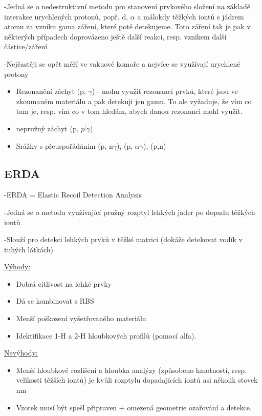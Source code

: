 -Jedná se o nedestruktivní metodu pro stanovení prvkového složení na základě interakce urychlených protonů, popř. d, $\alpha$ a málokdy těžkých iontů s jádrem atomu za vzniku gama záření, které poté detekujeme. Toto záření tak je pak v některých případech doprovázeno ještě další reakcí, resp. vznikem další částice/záření

-Nejčastěji se opět měří ve vakuové komoře a nejvíce se využívají urychlené protony

\begin{itemize}
    \item Rezonanční záchyt (p, $\gamma$) - mohu využít rezonancí prvků, které jsou ve zkoumaném materiálu a pak detekuji jen gamu. To ale vyžaduje, že vím co tam je, resp. vím co v tom hledám, abych danou rezonanci mohl využít.

    \item nepružný záchyt (p, $p^| \gamma$)

    \item Srážky s přeuspořádáním (p, n$\gamma$), (p, $\alpha\gamma$), (p,n)
\end{itemize}

\subsection{ERDA}

-ERDA = Elastic Recoil Detection Analysis


-Jedná se o metodu využívající pružný rozptyl lehkých jader po dopadu těžkých iontů

-Slouží pro detekci lehkých prvků v těžké matrici (dokáže detekovat vodík v tuhých látkách)

\underline{Výhody:}
\begin{itemize}
\item Dobrá citlivost na lehké prvky
    \item Dá se kombinovat s RBS
    \item Menší poškození vyšetřovaného materiálu
    \item Idektifikace 1-H a 2-H hloubkových profilů (pomocí alfa).
\end{itemize}

\underline{Nevýhody:}
\begin{itemize}
    \item Menší hloubkové rozlišení a hloubka analýzy (způsobeno hmotností, resp. velikosti těžších iontů) je kvůli rozptylu dopadajících iontů asi několik stovek nm
    \item Vzorek musí být spešl připraven + omezená geometrie ozařování a detekce.
\end{itemize}

